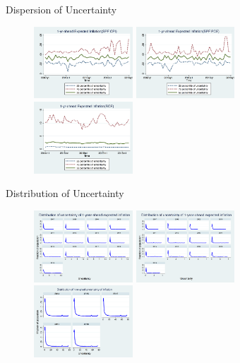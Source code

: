 \documentclass{beamer}
\begin{document}
\begin{frame}{Dispersion of Uncertainty}
\begin{figure}
	\label{IQR_Unceratitny}
	\includegraphics[width=0.33\textwidth]{figuresDraft/IQRvarCPIQ.png}
\smallskip
\includegraphics[width=0.33\textwidth]{figuresDraft/IQRvarPCEQ.png}
\smallskip
\includegraphics[width=0.33\textwidth]{figuresDraft/IQRvarSCEM.png}
\end{figure}
\end{frame}


\begin{frame}{Distribution of Uncertainty}
\begin{figure}
		\label{Unceratitny_Histogram}
	\includegraphics[width=0.33\textwidth]{figuresDraft/PRCCPIVar1_hist.png}  
\smallskip
\includegraphics[width=0.33\textwidth]{figuresDraft/PRCPCEVar1_hist.png}  
\smallskip
\includegraphics[width=0.33\textwidth]{figuresDraft/SCEvar_hist.png}  
\end{figure}
\end{frame}
\end{document}
